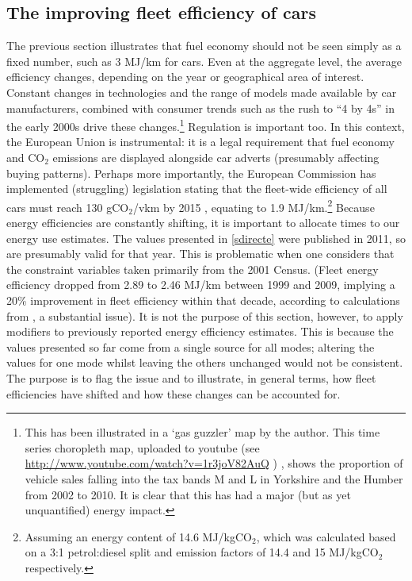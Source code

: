 \subsection{The improving fleet efficiency of cars}
The previous section illustrates that fuel economy should not be seen simply as a
fixed number, such as 3 MJ/km for cars. Even at the aggregate level, the
average efficiency changes, depending on the year or 
geographical area of interest. Constant changes in technologies and
the range of models made available by car manufacturers, combined
with consumer trends such as the rush to ``4 by 4s'' in the early 2000s
drive these changes.\footnote{This has
been illustrated in a `gas guzzler' map by the author.
This time series choropleth map, uploaded to youtube
(see \url{http://www.youtube.com/watch?v=1r3joV82AuQ} ) ,
shows the proportion of
vehicle sales falling into the tax bands M and L in Yorkshire and the
Humber from 2002 to 2010. It is clear that this has had a major
(but as yet unquantified) energy impact.
}
Regulation is important too. In this context,
the European Union is instrumental: it is a legal
requirement that fuel economy and CO$_2$ emissions
are displayed alongside car adverts (presumably affecting buying patterns).
Perhaps more importantly, the European Commission has implemented
(struggling) legislation stating that the fleet-wide efficiency of
all cars must reach 130 gCO$_2$/vkm by 2015 \citep{Fontaras2010}, equating to
1.9 MJ/km.\footnote{Assuming an energy content of 14.6 MJ/kgCO$_2$,
which was calculated based on a 3:1 petrol:diesel split and
emission factors of 14.4 and 15 MJ/kgCO$_2$ respectively.
}
Because energy efficiencies are constantly shifting, it is important
to allocate times to our energy use estimates. The values presented in
\cref{sdirecte} were published in 2011, so are presumably valid for that
year. This is problematic when one considers that the constraint variables
taken primarily from the 2001 Census.
(Fleet energy efficiency dropped from 2.89 to 2.46 MJ/km between 1999 and 2009,
implying a 20\% improvement in fleet efficiency within that decade,
according to calculations from \citet[table 2.8]{Decc2011t}, a substantial issue).
It is not the purpose of this section, however, to apply modifiers to previously reported
energy efficiency estimates. This is because the values presented so far
come from a single source for all modes; altering the values for
one mode whilst leaving the others unchanged would not be consistent.
The purpose is to flag the issue and to
illustrate, in general terms, how fleet efficiencies have shifted and
how these changes can be accounted for.

